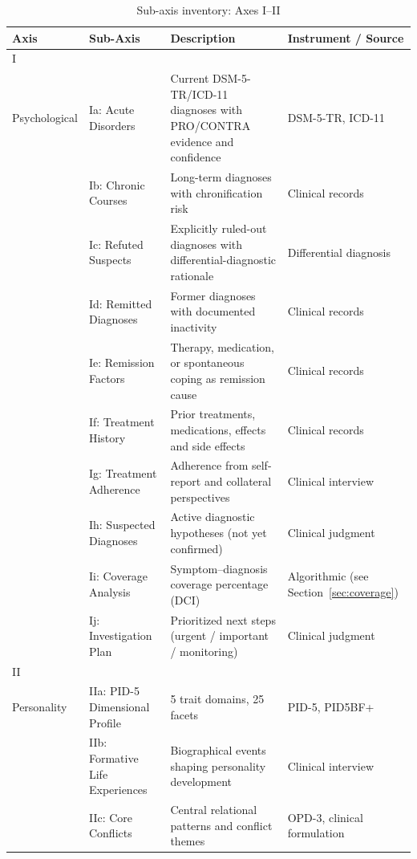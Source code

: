 \documentclass[11pt,a4paper]{article}
\newenvironment{CompactLongTable}{%
  \begingroup
  \footnotesize
  \setstretch{1.0}%
  \setlength{\LTpre}{0pt}%
  \setlength{\LTpost}{0pt}%
}{%
  \endgroup
}
\begin{document}
\begin{table}[H]
\centering
\caption{Sub-axis inventory: Axes I--II}
\label{tab:subaxes_part1}
\begin{CompactLongTable}
\begin{tabular}{@{}L{1.8cm}L{2.4cm}L{5.0cm}L{4.0cm}@{}}
\toprule
\textbf{Axis} & \textbf{Sub-Axis} & \textbf{Description} & \textbf{Instrument / Source} \\
\midrule
I\\Psychological & Ia: Acute Disorders & Current DSM-5-TR/ICD-11 diagnoses with PRO/CONTRA evidence and confidence & DSM-5-TR, ICD-11 \\
 & Ib: Chronic Courses & Long-term diagnoses with chronification risk & Clinical records \\
 & Ic: Refuted Suspects & Explicitly ruled-out diagnoses with differential-diagnostic rationale & Differential diagnosis \\
 & Id: Remitted Diagnoses & Former diagnoses with documented inactivity & Clinical records \\
 & Ie: Remission Factors & Therapy, medication, or spontaneous coping as remission cause & Clinical records \\
 & If: Treatment History & Prior treatments, medications, effects and side effects & Clinical records \\
 & Ig: Treatment Adherence & Adherence from self-report and collateral perspectives & Clinical interview \\
 & Ih: Suspected Diagnoses & Active diagnostic hypotheses (not yet confirmed) & Clinical judgment \\
 & Ii: Coverage Analysis & Symptom--diagnosis coverage percentage (DCI) & Algorithmic (see Section~\ref{sec:coverage}) \\
 & Ij: Investigation Plan & Prioritized next steps (urgent / important / monitoring) & Clinical judgment \\
\midrule
II\\Personality & IIa: PID-5 Dimensional Profile & 5 trait domains, 25 facets & PID-5, PID5BF+ \\
 & IIb: Formative Life Experiences & Biographical events shaping personality development & Clinical interview \\
 & IIc: Core Conflicts & Central relational patterns and conflict themes & OPD-3, clinical formulation \\
\bottomrule
\end{tabular}
\end{CompactLongTable}
\end{table}
\end{document}
